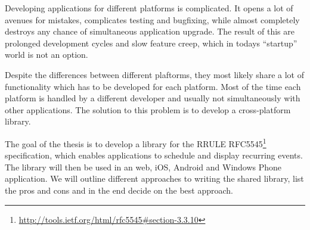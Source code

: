 \begin{Abstract}

Developing applications for different platforms is complicated. It opens a lot of avenues for mistakes, complicates testing and bugfixing, while almost completely destroys any chance of simultaneous application upgrade. The result of this are prolonged development cycles and slow feature creep, which in todays ``startup'' world is not an option.

Despite the differences between different plaftorms, they most likely share a lot of functionality which has to be developed for each platform. Most of the time each platform is handled by a different developer and usually not simultaneously with other applications. The solution to this problem is to develop a cross-platform library.

The goal of the thesis is to develop a library for the RRULE RFC5545\footnote{\href{http://tools.ietf.org/html/rfc5545\#section-3.3.10}{http://tools.ietf.org/html/rfc5545\#section-3.3.10}} specification, which enables applications to schedule and display recurring events. The library will then be used in an web, iOS, Android and Windows Phone application. We will outline different approaches to writing the shared library, list the pros and cons and in the end decide on the best approach.
\end{Abstract}
